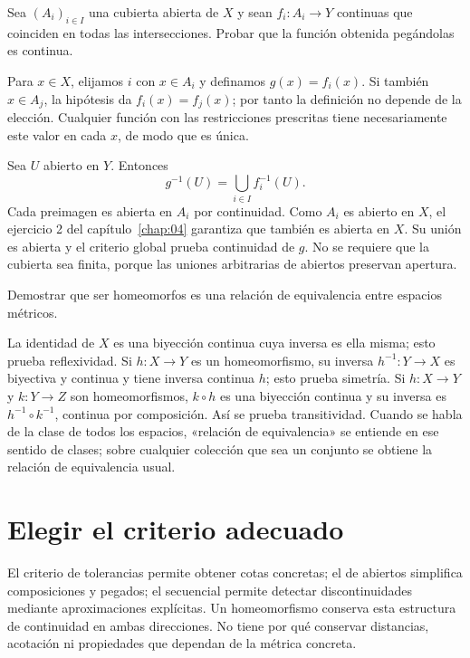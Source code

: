 \begin{ejercicio}
Sea $(A_i)_{i\in I}$ una cubierta abierta de $X$ y sean $f_i:A_i\to Y$ continuas que coinciden en todas las intersecciones. Probar que la función obtenida pegándolas es continua.
\end{ejercicio}
\begin{solucion}
Para $x\in X$, elijamos $i$ con $x\in A_i$ y definamos $g(x)=f_i(x)$. Si también $x\in A_j$, la hipótesis da $f_i(x)=f_j(x)$; por tanto la definición no depende de la elección. Cualquier función con las restricciones prescritas tiene necesariamente este valor en cada $x$, de modo que es única.

Sea $U$ abierto en $Y$. Entonces
\[
g^{-1}(U)=\bigcup_{i\in I}f_i^{-1}(U).
\]
Cada preimagen es abierta en $A_i$ por continuidad. Como $A_i$ es abierto en $X$, el ejercicio 2 del capítulo~\ref{chap:04} garantiza que también es abierta en $X$. Su unión es abierta y el criterio global prueba continuidad de $g$. No se requiere que la cubierta sea finita, porque las uniones arbitrarias de abiertos preservan apertura.
\end{solucion}

\begin{ejercicio}
Demostrar que ser homeomorfos es una relación de equivalencia entre espacios métricos.
\end{ejercicio}
\begin{solucion}
La identidad de $X$ es una biyección continua cuya inversa es ella misma; esto prueba reflexividad. Si $h:X\to Y$ es un homeomorfismo, su inversa $h^{-1}:Y\to X$ es biyectiva y continua y tiene inversa continua $h$; esto prueba simetría. Si $h:X\to Y$ y $k:Y\to Z$ son homeomorfismos, $k\circ h$ es una biyección continua y su inversa es $h^{-1}\circ k^{-1}$, continua por composición. Así se prueba transitividad. Cuando se habla de la clase de todos los espacios, «relación de equivalencia» se entiende en ese sentido de clases; sobre cualquier colección que sea un conjunto se obtiene la relación de equivalencia usual.
\end{solucion}

\section{Elegir el criterio adecuado}
El criterio de tolerancias permite obtener cotas concretas; el de abiertos simplifica composiciones y pegados; el secuencial permite detectar discontinuidades mediante aproximaciones explícitas. Un homeomorfismo conserva esta estructura de continuidad en ambas direcciones. No tiene por qué conservar distancias, acotación ni propiedades que dependan de la métrica concreta.
